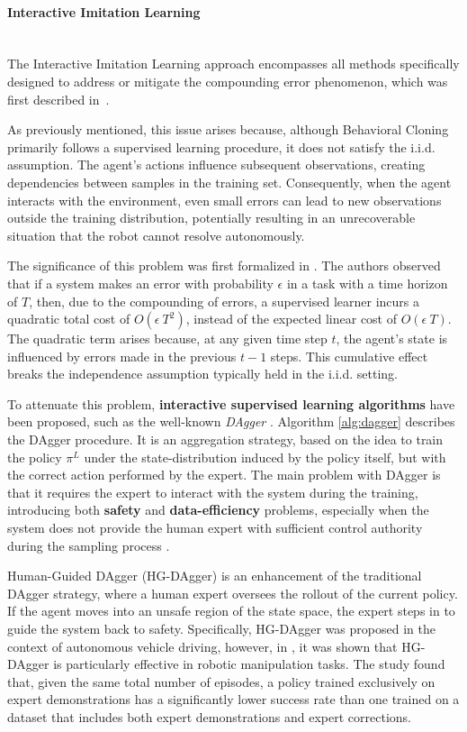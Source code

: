 \paragraph*{Interactive Imitation Learning}\mbox{}\\
The Interactive Imitation Learning approach encompasses all methods specifically designed to address or mitigate the compounding error phenomenon, which was first described in~\cite{pomerleau1988alvinn}.

As previously mentioned, this issue arises because, although Behavioral Cloning primarily follows a supervised learning procedure, it does not satisfy the i.i.d. assumption. The agent's actions influence subsequent observations, creating dependencies between samples in the training set. Consequently, when the agent interacts with the environment, even small errors can lead to new observations outside the training distribution, potentially resulting in an unrecoverable situation that the robot cannot resolve autonomously.

The significance of this problem was first formalized in \cite{ross2010efficient_reductions}. The authors observed that if a system makes an error with probability $\epsilon$ in a task with a time horizon of $T$, then, due to the compounding of errors, a supervised learner incurs a quadratic total cost of $O(\epsilon \ T^{2})$, instead of the expected linear cost of $O(\epsilon \ T)$. The quadratic term arises because, at any given time step $t$, the agent's state is influenced by errors made in the previous $t-1$ steps. This cumulative effect breaks the independence assumption typically held in the i.i.d. setting.

To attenuate this problem, \textbf{interactive supervised learning algorithms} have been proposed, such as the well-known \textit{DAgger} \cite{ross2011dagger}. Algorithm \ref{alg:dagger} describes the DAgger procedure. It is an aggregation strategy, based on the idea to train the policy $\pi^{L}$ under the state-distribution induced by the policy itself, but with the correct action performed by the expert. The main problem with DAgger is that it requires the expert to interact with the system during the training, introducing both \textbf{safety} and \textbf{data-efficiency} problems, especially when the system does not provide the human expert with sufficient control authority during the sampling process \cite{laskey2017comparing_hc_rc}. 


Human-Guided DAgger (HG-DAgger) \cite{kelly2019hg_dagger} is an enhancement of the traditional DAgger strategy, where a human expert oversees the rollout of the current policy. If the agent moves into an unsafe region of the state space, the expert steps in to guide the system back to safety. Specifically, HG-DAgger was proposed in the context of autonomous vehicle driving, however, in \cite{jang2022bc_z}, it was shown that HG-DAgger is particularly effective in robotic manipulation tasks. The study found that, given the same total number of episodes, a policy trained exclusively on expert demonstrations has a significantly lower success rate than one trained on a dataset that includes both expert demonstrations and expert corrections.

